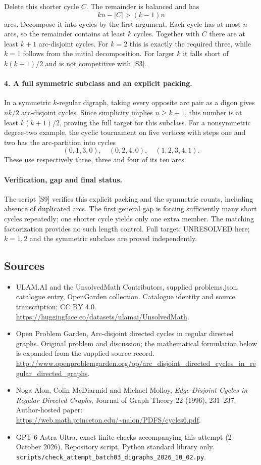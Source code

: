 \documentclass[11pt,a4paper]{article}
\begin{document}
Delete this shorter cycle $C$. The remainder is balanced and has
\[
                 kn-|C|>(k-1)n
\]
arcs. Decompose it into cycles by the first argument. Each cycle
has at most $n$ arcs, so the remainder contains at least $k$ cycles.
Together with $C$ there are at least $k+1$ arc-disjoint cycles.
For $k=2$ this is exactly the required three, while $k=1$ follows
from the initial decomposition. For larger $k$ it falls short of
$k(k+1)/2$ and is not competitive with [S3].

\paragraph{4. A full symmetric subclass and an explicit packing.}
In a symmetric $k$-regular digraph, taking every opposite arc pair
as a digon gives $nk/2$ arc-disjoint cycles. Since simplicity implies
$n\ge k+1$, this number is at least $k(k+1)/2$, proving the full
target for this subclass. For a nonsymmetric degree-two example,
the cyclic tournament on five vertices with steps one and two has
the arc-partition into cycles
\[
            (0,1,3,0),\quad(0,2,4,0),\quad(1,2,3,4,1).
\]
These use respectively three, three and four of its ten arcs.

\paragraph{Verification, gap and final status.}
The script [S9] verifies this explicit packing and the symmetric
counts, including absence of duplicated arcs. The first general gap
is forcing sufficiently many short cycles repeatedly; one shorter
cycle yields only one extra member. The matching factorization
provides no such length control. Full target: UNRESOLVED here;
$k=1,2$ and the symmetric subclass are proved independently.
\subsection{Sources}
\begin{itemize}
\item[S1] ULAM.AI and the UnsolvedMath Contributors, supplied problems.json, catalogue entry, OpenGarden collection. Catalogue identity and source transcription; CC BY 4.0.
\url{https://huggingface.co/datasets/ulamai/UnsolvedMath}.
\item[S2] Open Problem Garden, Arc-disjoint directed cycles in regular directed graphs. Original problem and discussion; the mathematical formulation below is expanded from the supplied source record.
\url{http://www.openproblemgarden.org/op/arc_disjoint_directed_cycles_in_regular_directed_graphs}.
\item[S3] Noga Alon, Colin McDiarmid and Michael Molloy, \emph{Edge-Disjoint Cycles in Regular Directed Graphs}, Journal of Graph Theory 22 (1996), 231--237. Author-hosted paper: \url{https://web.math.princeton.edu/~nalon/PDFS/cycles6.pdf}.
\item[S9] GPT-6 Astra Ultra, exact finite checks accompanying this attempt (2 October 2026). Repository script, Python standard library only. \texttt{scripts/check\_attempt\_batch03\_digraphs\_2026\_10\_02.py}.
\end{itemize}
\end{document}
